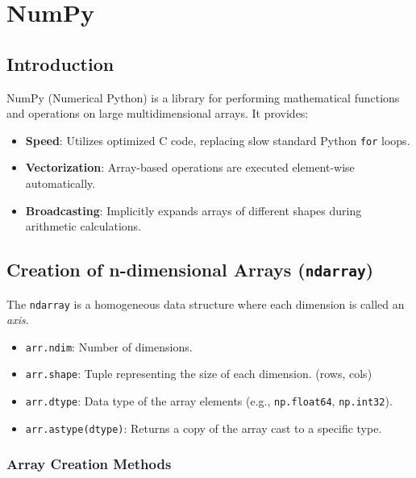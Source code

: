\section{NumPy}
\subsection{Introduction}
NumPy (Numerical Python) is a library for performing mathematical functions and operations on large multidimensional arrays. It provides:
\begin{itemize}
    \item \textbf{Speed}: Utilizes optimized C code, replacing slow standard Python \texttt{for} loops.
    \item \textbf{Vectorization}: Array-based operations are executed element-wise automatically.
    \item \textbf{Broadcasting}: Implicitly expands arrays of different shapes during arithmetic calculations.
\end{itemize}

\subsection{Creation of n-dimensional Arrays (\texttt{ndarray})}
The \texttt{ndarray} is a homogeneous data structure where each dimension is called an \textit{axis}.
\begin{itemize}
    \item \texttt{arr.ndim}: Number of dimensions.
    \item \texttt{arr.shape}: Tuple representing the size of each dimension. (rows, cols)
    \item \texttt{arr.dtype}: Data type of the array elements (e.g., \texttt{np.float64}, \texttt{np.int32}).
    \item \texttt{arr.astype(dtype)}: Returns a copy of the array cast to a specific type.
\end{itemize}

\subsubsection{Array Creation Methods}



